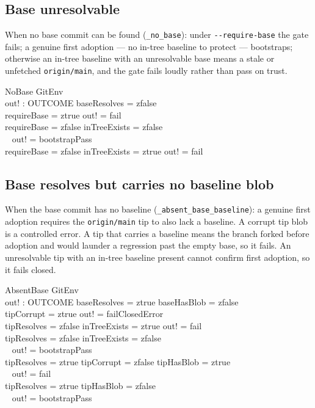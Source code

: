 \documentclass[a4paper,10pt,fleqn]{article}
\begin{document}
\subsection{Base unresolvable}

When no base commit can be found (\texttt{\_no\_base}): under
\texttt{-{}-require-base} the gate fails; a genuine first adoption --- no
in-tree baseline to protect --- bootstraps; otherwise an in-tree baseline
with an unresolvable base means a stale or unfetched \texttt{origin/main},
and the gate fails loudly rather than pass on trust.

\begin{schema}{NoBase}
GitEnv \\
out! : OUTCOME
\where
baseResolves = zfalse \\
requireBase = ztrue \implies out! = fail \\
requireBase = zfalse \land inTreeExists = zfalse \implies \\
\quad~ out! = bootstrapPass \\
requireBase = zfalse \land inTreeExists = ztrue \implies out! = fail
\end{schema}

\subsection{Base resolves but carries no baseline blob}

When the base commit has no baseline (\texttt{\_absent\_base\_baseline}):
a genuine first adoption requires the \texttt{origin/main} tip to also
lack a baseline. A corrupt tip blob is a controlled error. A tip that
carries a baseline means the branch forked before adoption and would
launder a regression past the empty base, so it fails. An unresolvable
tip with an in-tree baseline present cannot confirm first adoption, so it
fails closed.

\begin{schema}{AbsentBase}
GitEnv \\
out! : OUTCOME
\where
baseResolves = ztrue \land baseHasBlob = zfalse \\
tipCorrupt = ztrue \implies out! = failClosedError \\
tipResolves = zfalse \land inTreeExists = ztrue \implies out! = fail \\
tipResolves = zfalse \land inTreeExists = zfalse \implies \\
\quad~ out! = bootstrapPass \\
tipResolves = ztrue \land tipCorrupt = zfalse \land tipHasBlob = ztrue \\
\quad~ \implies out! = fail \\
tipResolves = ztrue \land tipHasBlob = zfalse \implies \\
\quad~ out! = bootstrapPass
\end{schema}
\end{document}
